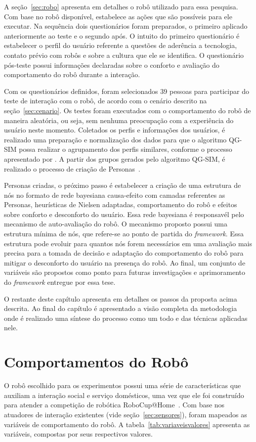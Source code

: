 A seção~\ref{sec:robo} apresenta em detalhes o robô utilizado para essa pesquisa. Com base no robô disponível, estabelece as ações que são possíveis para ele executar. Na sequência dois questionários foram preparados, o primeiro aplicado anteriormente ao teste e o segundo após. O intuito do primeiro questionário é estabelecer o perfil do usuário referente a questões de aderência a tecnologia, contato prévio com robôs e sobre a cultura que ele se identifica. O questionário pós-teste possui informações declaradas sobre o conforto e avaliação do comportamento do robô durante a interação.

Com os questionários definidos, foram selecionados 39 pessoas para participar do teste de interação com o robô, de acordo com o cenário descrito na seção~\ref{sec:cenario}. Os testes foram executados com o comportamento do robô de maneira aleatória, ou seja, sem nenhuma preocupação com a experiência do usuário neste momento. Coletados os perfis e informações dos usuários, é realizado uma preparação e normalização dos dados para que o algoritmo QG-SIM possa realizar o agrupamento dos perfis similares, conforme o processo apresentado por . A partir dos grupos gerados pelo algoritmo QG-SIM, é realizado o processo de criação de Personas~\cite{masiero:2013, masiero:2013b}.

Personas criadas, o próximo passo é estabelecer a criação de uma estrutura de nós no formato de rede bayesiana causa-efeito com camadas referentes as Personas, heurísticas de Nielsen adaptadas, comportamento do robô e efeitos sobre conforto e desconforto do usuário. Essa rede bayesiana é responsavél pelo mecanismo de auto-avaliação do robô. O mecanismo proposto possui uma estrutura mínima de nós, que refere-se ao ponto de partida do \emph{framework}. Essa estrutura pode evoluir para quantos nós forem necessários em uma avaliação mais precisa para a tomada de decisão e adaptação do comportamento do robô para mitigar o desconforto do usuário na presença do robô. Ao final, um conjunto de variáveis são propostos como ponto para futuras investigações e aprimoramento do \emph{framework} entregue por essa tese.

O restante deste capítulo apresenta em detalhes os passos da proposta acima descrita. Ao final do capítulo é apresentado a visão completa da metodologia onde é realizado uma síntese do processo como um todo e das técnicas aplicadas nele.

\section{Comportamentos do Robô}
\label{sec:comportamento-robo}
O robô escolhido para os experimentos possui uma série de características que auxiliam a interação social e serviço domésticos, uma vez que ele foi construído para atender a competição de robótica RoboCup@Home~\cite{robocup:2015}. Com base nos atuadores de interação existentes (vide seção~\ref{sec:sensores}), foram mapeados as variáveis de comportamento do robô. A tabela~\ref{tab:variaveisvalores} apresenta as variáveis, compostas por seus respectivos valores.

